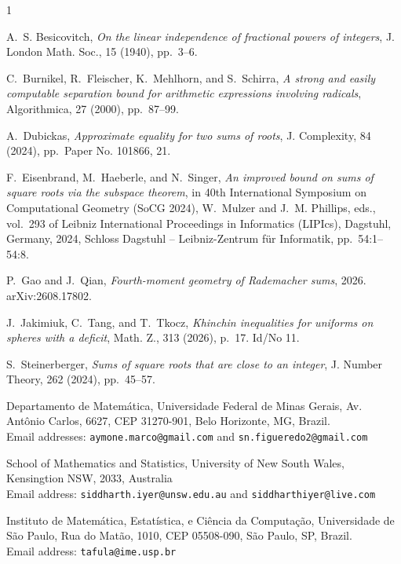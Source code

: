\documentclass[reqno,12pt]{amsart}
\theoremstyle{remark}
\begin{document}
\begin{thebibliography}{1}

{\sc A.~S. Besicovitch}, {\em On the linear independence of fractional powers of integers}, J. London Math. Soc., 15 (1940), pp.~3--6.

{\sc C.~Burnikel, R.~Fleischer, K.~Mehlhorn, and S.~Schirra}, {\em A strong and easily computable separation bound for arithmetic expressions involving radicals}, Algorithmica, 27 (2000), pp.~87--99.

{\sc A.~Dubickas}, {\em Approximate equality for two sums of roots}, J. Complexity, 84 (2024), pp.~Paper No. 101866, 21.

{\sc F.~Eisenbrand, M.~Haeberle, and N.~Singer}, {\em An improved bound on sums of square roots via the subspace theorem}, in 40th International Symposium on Computational Geometry (SoCG 2024), W.~Mulzer and J.~M. Phillips, eds., vol.~293 of Leibniz International Proceedings in Informatics (LIPIcs), Dagstuhl, Germany, 2024, Schloss Dagstuhl -- Leibniz-Zentrum f{\"u}r Informatik, pp.~54:1--54:8.

{\sc P.~Gao and J.~Qian}, {\em Fourth-moment geometry of {R}ademacher sums}, 2026.
\newblock arXiv:2608.17802.

{\sc J.~Jakimiuk, C.~Tang, and T.~Tkocz}, {\em Khinchin inequalities for uniforms on spheres with a deficit}, Math. Z., 313 (2026), p.~17.
\newblock Id/No 11.

{\sc S.~Steinerberger}, {\em Sums of square roots that are close to an integer}, J. Number Theory, 262 (2024), pp.~45--57.

\end{thebibliography}


\bigskip
\noindent\small
Departamento de Matem\'atica, Universidade Federal de Minas Gerais, Av. Ant\^onio Carlos, 6627, CEP 31270-901, Belo Horizonte, MG, Brazil.\\ Email addresses: \texttt{aymone.marco@gmail.com} and \texttt{sn.figueredo2@gmail.com}
\medskip


\noindent
School of Mathematics and Statistics, University of New South Wales, Kensingtion NSW, 2033, Australia\\
Email address: \texttt{siddharth.iyer@unsw.edu.au} and \texttt{siddharthiyer@live.com}


\noindent
Instituto de Matem\'atica, Estat\'istica, e Ci\^encia da Computa\c c\~ao, Universidade de S\~ao Paulo, Rua do Mat\~ao, 1010, CEP 05508-090, S\~ao Paulo, SP, Brazil.\\ Email address: \texttt{tafula@ime.usp.br}
\medskip
\end{document}

